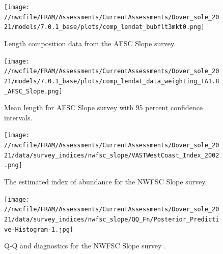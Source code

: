 \documentclass[11pt,
  english,
  a4paper,
]{article}
\begin{document}
\begin{figure}
\centering
\texttt{[image: //nwcfile/FRAM/Assessments/CurrentAssessments/Dover\_sole\_2021/models/7.0.1\_base/plots/comp\_lendat\_bubflt3mkt0.png]}
\caption{Length composition data from the AFSC Slope survey.\label{fig:afsc-len-data}}
\end{figure}

\tagmcend\tagstructend


\begin{figure}
\centering
\texttt{[image: //nwcfile/FRAM/Assessments/CurrentAssessments/Dover\_sole\_2021/models/7.0.1\_base/plots/comp\_lendat\_data\_weighting\_TA1.8\_AFSC\_Slope.png]}
\caption{Mean length for AFSC Slope survey with 95 percent confidence intervals.\label{fig:mean-afsc-len-data}}
\end{figure}

\tagmcend\tagstructend


\begin{figure}
\centering
\texttt{[image: //nwcfile/FRAM/Assessments/CurrentAssessments/Dover\_sole\_2021/data/survey\_indices/nwfsc\_slope/VASTWestCoast\_Index\_2002.png]}
\caption{The estimated index of abundance for the NWFSC Slope survey.\label{fig:nwfsc-index}}
\end{figure}

\tagmcend\tagstructend

\newpage


\begin{figure}
\centering
\texttt{[image: //nwcfile/FRAM/Assessments/CurrentAssessments/Dover\_sole\_2021/data/survey\_indices/nwfsc\_slope/QQ\_Fn/Posterior\_Predictive-Histogram-1.jpg]}
\caption{Q-Q and diagnostics for the NWFSC Slope survey .\label{fig:nwfsc-qq}}
\end{figure}

\tagmcend\tagstructend

\newpage

\end{document}
